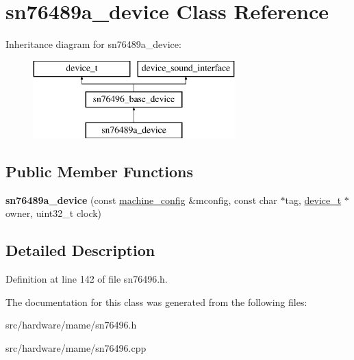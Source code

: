 \hypertarget{classsn76489a__device}{\section{sn76489a\-\_\-device Class Reference}
\label{classsn76489a__device}
}
Inheritance diagram for sn76489a\-\_\-device\-:\begin{figure}[H]
\begin{center}
\leavevmode
\includegraphics[height=3.000000cm]{classsn76489a__device}
\end{center}
\end{figure}
\subsection*{Public Member Functions}
\begin{DoxyCompactItemize}
\item 
\hypertarget{classsn76489a__device_a5a8ba5c28290d010c6e12fc04727103d}{{\bfseries sn76489a\-\_\-device} (const \hyperlink{structmachine__config}{machine\-\_\-config} \&mconfig, const char $\ast$tag, \hyperlink{classdevice__t}{device\-\_\-t} $\ast$owner, uint32\-\_\-t clock)}\label{classsn76489a__device_a5a8ba5c28290d010c6e12fc04727103d}

\end{DoxyCompactItemize}


\subsection{Detailed Description}


Definition at line 142 of file sn76496.\-h.



The documentation for this class was generated from the following files\-:\begin{DoxyCompactItemize}
\item 
src/hardware/mame/sn76496.\-h\item 
src/hardware/mame/sn76496.\-cpp\end{DoxyCompactItemize}
